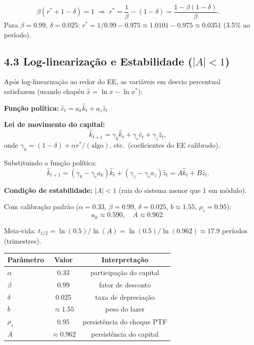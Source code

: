 \documentclass[12pt, a4paper]{article}
\begin{document}
\begin{resultbox}[title={Condição de Euler no EE do RBC}]
\[
\beta(r^* + 1 - \delta) = 1 \;\Longrightarrow\; r^* = \frac{1}{\beta} - (1-\delta) = \frac{1-\beta(1-\delta)}{\beta}.
\]
Para $\beta = 0.99$, $\delta = 0.025$: $r^* = 1/0.99 - 0.975 \approx 1.0101 - 0.975 \approx 0.0351$ (3.5\% ao período).
\end{resultbox}

\subsection*{4.3 Log-linearização e Estabilidade ($|A|<1$)}

Após log-linearização ao redor do EE, as variáveis em desvio percentual satisfazem (usando chapéu $\hat{x} = \ln x - \ln x^*$):

\textbf{Função política:} $\hat{c}_t = a_k\hat{k}_t + a_z\hat{z}_t$

\textbf{Lei de movimento do capital:}
\[
\hat{k}_{t+1} = \gamma_k\hat{k}_t + \gamma_c\hat{c}_t + \gamma_z\hat{z}_t,
\]
onde $\gamma_k = (1-\delta) + \alpha r^*/(\text{algo})$, etc.\ (coeficientes do EE calibrado).

Substituindo a função política:
\[
\hat{k}_{t+1} = (\gamma_k - \gamma_c a_k)\hat{k}_t + (\gamma_z - \gamma_c a_z)\hat{z}_t = A\hat{k}_t + B\hat{z}_t.
\]

\textbf{Condição de estabilidade:} $|A| < 1$ (raiz do sistema menor que 1 em módulo).

Com calibração padrão ($\alpha=0.33$, $\beta=0.99$, $\delta=0.025$, $b\approx1.55$, $\rho_z=0.95$):
\[
a_k \approx 0.590, \quad A \approx 0.962.
\]

Meia-vida: $t_{1/2} = \ln(0.5)/\ln(A) = \ln(0.5)/\ln(0.962) \approx 17.9$ períodos (trimestres).

\begin{center}
\begin{tabular}{lcc}
\toprule
Parâmetro & Valor & Interpretação \\
\midrule
$\alpha$ & 0.33 & participação do capital \\
$\beta$  & 0.99 & fator de desconto \\
$\delta$ & 0.025 & taxa de depreciação \\
$b$      & $\approx 1.55$ & peso do lazer \\
$\rho_z$ & 0.95 & persistência do choque PTF \\
$A$      & $\approx 0.962$ & persistência do capital \\
\bottomrule
\end{tabular}
\end{center}
\end{document}
